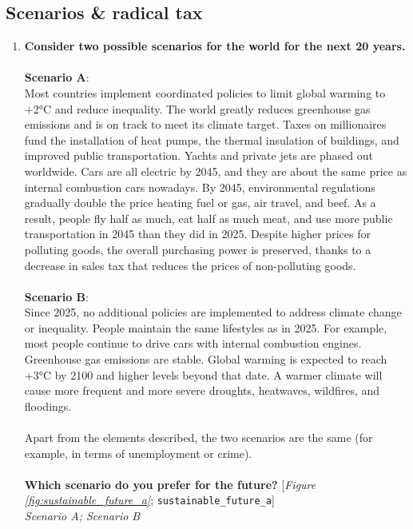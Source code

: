  \subsection*{Scenarios & radical tax} 
 \begin{enumerate}[resume] 
\item  \label{q:sustainable_future_a} \textbf{Consider two possible scenarios for the world for the next 20 years.\~\\\\Scenario A}: \\Most countries implement coordinated policies to limit global warming to +2°C and reduce inequality. The world greatly reduces greenhouse gas emissions and is on track to meet its climate target. Taxes on millionaires fund the installation of heat pumps, the thermal insulation of buildings, and improved public transportation. Yachts and private jets are phased out worldwide. Cars are all electric by 2045, and they are about the same price as internal combustion cars nowadays. By 2045, environmental regulations gradually double the price heating fuel or gas, air travel, and beef. As a result, people fly half as much, eat half as much meat, and use more public transportation in 2045 than they did in 2025. Despite higher prices for polluting goods, the overall purchasing power is preserved, thanks to a decrease in sales tax that reduces the prices of non-polluting goods.\\\\\textbf{Scenario B}:\\Since 2025, no additional policies are implemented to address climate change or inequality. People maintain the same lifestyles as in 2025. For example, most people continue to drive cars with internal combustion engines. Greenhouse gas emissions are stable. Global warming is expected to reach +3°C by 2100 and higher levels beyond that date. A warmer climate will cause more frequent and more severe droughts, heatwaves, wildfires, and floodings.\\\\Apart from the elements described, the two scenarios are the same (for example, in terms of unemployment or crime). \\\\\textbf{Which scenario do you prefer for the future?} [\textit{Figure \ref{fig:sustainable_future_a}}; 
\verb|sustainable_future_a|]
  \\ \textit{Scenario A; Scenario B}


\end{enumerate}
